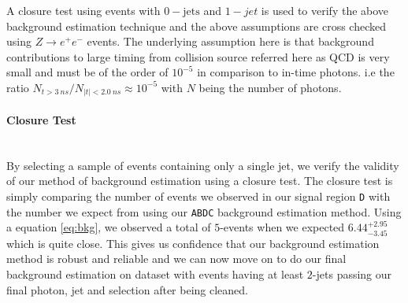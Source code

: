 A closure test using events with $0-\mbox{jets}$ and $1-jet$ is used to verify the above  background estimation technique and the above assumptions are cross checked using $Z\rightarrow e^{+} e^{-}$ events. 
The underlying assumption here is that background contributions to large timing from collision source referred here as QCD is very small and must be of the order of $10^{-5}$ in comparison to in-time photons. i.e the ratio 
$ N_{t > 3~ns}/ N_{|t| < 2.0~ns} \approx 10^{-5}$ with $N$ being the number of photons.

\paragraph*{Closure Test}\mbox{}\\
By selecting a sample of events containing only a single jet, we verify the validity of our method of background estimation using a closure test. The closure test is simply comparing the number of events we observed in our signal region \texttt{D} with the number we expect from using our \texttt{ABDC} background estimation method.
Using a equation \ref{eq:bkg}, we observed a total of $5$-events when we expected $6.44^{+2.95}_{-3.45}$ which is quite close. This gives us confidence that our  background estimation method is robust and reliable and we can now move on to do our final background estimation on dataset with events having at least $2$-jets passing our final photon, jet and \MET selection after being cleaned.
